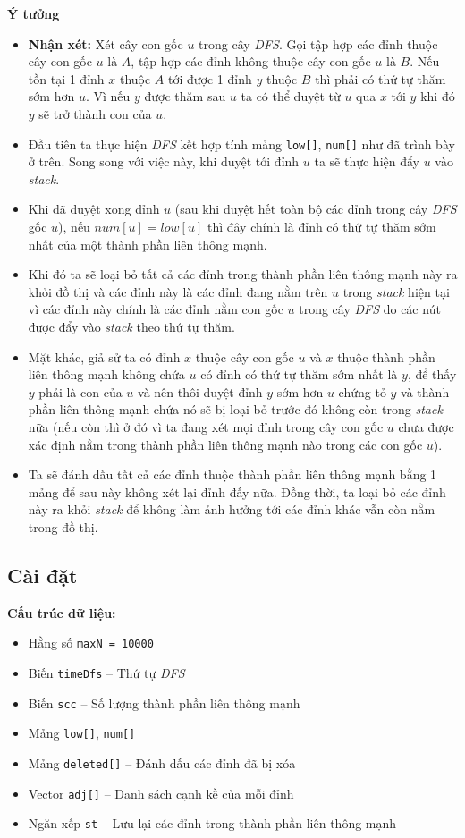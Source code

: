 \documentclass{article}
\begin{document}
\textbf{Ý tưởng}
\begin{itemize}
    \item \textbf{Nhận xét:} Xét cây con gốc $u$ trong cây \textit{DFS}. Gọi tập hợp các đỉnh thuộc cây con gốc $u$ là $A$, tập hợp các đỉnh không thuộc cây con gốc $u$ là $B$. Nếu tồn tại 1 đỉnh $x$ thuộc $A$ tới được 1 đỉnh $y$ thuộc $B$ thì phải có thứ tự thăm sớm hơn $u$. Vì nếu $y$ được thăm sau $u$ ta có thể duyệt từ $u$ qua $x$ tới $y$ khi đó $y$ sẽ trở thành con của $u$.
    \item Đầu tiên ta thực hiện \textit{DFS} kết hợp tính mảng \texttt{low[]}, \texttt{num[]} như đã trình bày ở trên. Song song với việc này, khi duyệt tới đỉnh $u$ ta sẽ thực hiện đẩy $u$ vào \textit{stack}.
    \item Khi đã duyệt xong đỉnh $u$ (sau khi duyệt hết toàn bộ các đỉnh trong cây \textit{DFS} gốc $u$), nếu $num[u] = low[u]$ thì đây chính là đỉnh có thứ tự thăm sớm nhất của một thành phần liên thông mạnh.
    \item Khi đó ta sẽ loại bỏ tất cả các đỉnh trong thành phần liên thông mạnh này ra khỏi đồ thị và các đỉnh này là các đỉnh đang nằm trên $u$ trong \textit{stack} hiện tại vì các đỉnh này chính là các đỉnh nằm con gốc $u$ trong cây \textit{DFS} do các nút được đẩy vào \textit{stack} theo thứ tự thăm.
    \item Mặt khác, giả sử ta có đỉnh $x$ thuộc cây con gốc $u$ và $x$ thuộc thành phần liên thông mạnh không chứa $u$ có đỉnh có thứ tự thăm sớm nhất là $y$, để thấy $y$ phải là con của $u$ và nên thôi duyệt đỉnh $y$ sớm hơn $u$ chứng tỏ $y$ và thành phần liên thông mạnh chứa nó sẽ bị loại bỏ trước đó không còn trong \textit{stack} nữa (nếu còn thì ở đó vì ta đang xét mọi đỉnh trong cây con gốc $u$ chưa được xác định nằm trong thành phần liên thông mạnh nào trong các con gốc $u$).
    \item Ta sẽ đánh dấu tất cả các đỉnh thuộc thành phần liên thông mạnh bằng 1 mảng để sau này không xét lại đỉnh đấy nữa. Đồng thời, ta loại bỏ các đỉnh này ra khỏi \textit{stack} để không làm ảnh hưởng tới các đỉnh khác vẫn còn nằm trong đồ thị.
\end{itemize}

\subsection*{Cài đặt}

\textbf{Cấu trúc dữ liệu:}
\begin{itemize}
    \item Hằng số \texttt{maxN = 10000}
    \item Biến \texttt{timeDfs} -- Thứ tự \textit{DFS}
    \item Biến \texttt{scc} -- Số lượng thành phần liên thông mạnh
    \item Mảng \texttt{low[]}, \texttt{num[]}
    \item Mảng \texttt{deleted[]} -- Đánh dấu các đỉnh đã bị xóa
    \item Vector \texttt{adj[]} -- Danh sách cạnh kề của mỗi đỉnh
    \item Ngăn xếp \texttt{st} -- Lưu lại các đỉnh trong thành phần liên thông mạnh
\end{itemize}
\end{document}
